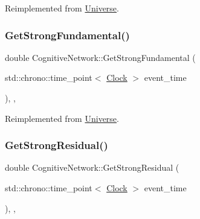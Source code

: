 Reimplemented from \mbox{\hyperlink{classUniverse_acb453ce71da418c5b5617fecede9571b}{Universe}}.

\mbox{\label{classCognitiveNetwork_a942ca90561fedae46136de620accbfea}} 
\subsubsection{\texorpdfstring{Get\+Strong\+Fundamental()}{GetStrongFundamental()}}
{\footnotesize\ttfamily double Cognitive\+Network\+::\+Get\+Strong\+Fundamental (\begin{DoxyParamCaption}\item[{std\+::chrono\+::time\+\_\+point$<$ \mbox{\hyperlink{universe_8h_a0ef8d951d1ca5ab3cfaf7ab4c7a6fd80}{Clock}} $>$}]{event\+\_\+time }\end{DoxyParamCaption})\hspace{0.3cm}{\ttfamily [inline]}, {\ttfamily [final]}, {\ttfamily [virtual]}}



Reimplemented from \mbox{\hyperlink{classUniverse_ab44daccba01ee7e3cf9b50bba83dd19e}{Universe}}.

\mbox{\label{classCognitiveNetwork_acfa5de663b3e686c4d9ea1a3bb483b11}} 
\subsubsection{\texorpdfstring{Get\+Strong\+Residual()}{GetStrongResidual()}}
{\footnotesize\ttfamily double Cognitive\+Network\+::\+Get\+Strong\+Residual (\begin{DoxyParamCaption}\item[{std\+::chrono\+::time\+\_\+point$<$ \mbox{\hyperlink{universe_8h_a0ef8d951d1ca5ab3cfaf7ab4c7a6fd80}{Clock}} $>$}]{event\+\_\+time }\end{DoxyParamCaption})\hspace{0.3cm}{\ttfamily [inline]}, {\ttfamily [final]}, {\ttfamily [virtual]}}



